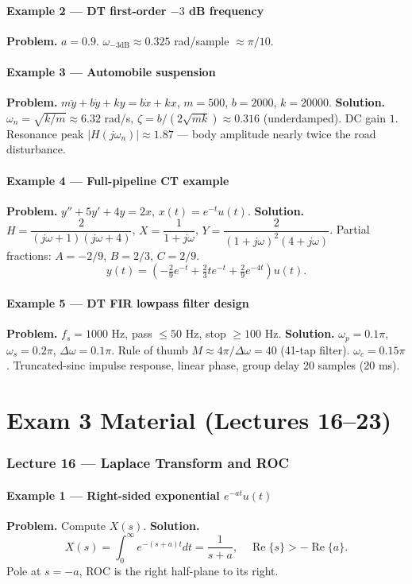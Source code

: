 \documentclass[11pt]{article}
\newcommand{\Real}{\operatorname{Re}}
\begin{document}
\subsection{Example 2 --- DT first-order $-3$ dB frequency}
\textbf{Problem.} $a=0.9$. $\omega_{-3\text{dB}}\approx 0.325$ rad/sample $\approx\pi/10$.

\subsection{Example 3 --- Automobile suspension}
\textbf{Problem.} $m\ddot y+b\dot y+ky=b\dot x+kx$, $m=500$, $b=2000$, $k=20000$.
\textbf{Solution.} $\omega_n=\sqrt{k/m}\approx 6.32$ rad/s, $\zeta=b/(2\sqrt{mk})\approx 0.316$ (underdamped). DC gain $1$. Resonance peak $|H(j\omega_n)|\approx 1.87$ --- body amplitude nearly twice the road disturbance.

\subsection{Example 4 --- Full-pipeline CT example}
\textbf{Problem.} $y''+5y'+4y=2x$, $x(t)=e^{-t}u(t)$.
\textbf{Solution.} $H=\dfrac{2}{(j\omega+1)(j\omega+4)}$, $X=\dfrac{1}{1+j\omega}$, $Y=\dfrac{2}{(1+j\omega)^2(4+j\omega)}$.
Partial fractions: $A=-2/9$, $B=2/3$, $C=2/9$.
\[y(t)=\left(-\tfrac{2}{9}e^{-t}+\tfrac{2}{3}te^{-t}+\tfrac{2}{9}e^{-4t}\right)u(t).\]

\subsection{Example 5 --- DT FIR lowpass filter design}
\textbf{Problem.} $f_s=1000$ Hz, pass $\le 50$ Hz, stop $\ge 100$ Hz.
\textbf{Solution.} $\omega_p=0.1\pi$, $\omega_s=0.2\pi$, $\Delta\omega=0.1\pi$. Rule of thumb $M\approx 4\pi/\Delta\omega=40$ (41-tap filter). $\omega_c=0.15\pi$. Truncated-sinc impulse response, linear phase, group delay 20 samples (20 ms).

\part{Exam 3 Material (Lectures 16--23)}

\section{Lecture 16 --- Laplace Transform and ROC}

\subsection{Example 1 --- Right-sided exponential $e^{-at}u(t)$}
\textbf{Problem.} Compute $X(s)$.
\textbf{Solution.}
\[X(s)=\int_0^{\infty}e^{-(s+a)t}dt=\frac{1}{s+a},\quad\Real\{s\}>-\Real\{a\}.\]
Pole at $s=-a$, ROC is the right half-plane to its right.
\end{document}
